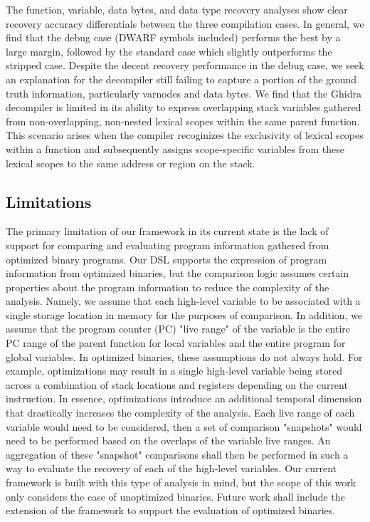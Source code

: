 \documentclass[conference]{IEEEtran}
\begin{document}
The function, variable, data bytes, and data type recovery analyses show clear recovery accuracy differentials between the three compilation cases. In general, we find that the debug case (DWARF symbols included) performs the best by a large margin, followed by the standard case which slightly outperforms the stripped case. Despite the decent recovery performance in the debug case, we seek an explanation for the decompiler still failing to capture a portion of the ground truth information, particularly varnodes and data bytes. We find that the Ghidra decompiler is limited in its ability to express overlapping stack variables gathered from non-overlapping, non-nested lexical scopes within the same parent function. This scenario arises when the compiler recoginizes the exclusivity of lexical scopes within a function and subsequently assigns scope-specific variables from these lexical scopes to the same address or region on the stack.

\subsection{Limitations}

The primary limitation of our framework in its current state is the lack of support for comparing and evaluating program information gathered from optimized binary programs. Our DSL supports the expression of program information from optimized binaries, but the comparison logic assumes certain properties about the program information to reduce the complexity of the analysis. Namely, we assume that each high-level variable to be associated with a single storage location in memory for the purposes of comparison. In addition, we assume that the program counter (PC) "live range" of the variable is the entire PC range of the parent function for local variables and the entire program for global variables. In optimized binaries, these assumptions do not always hold. For example, optimizations may result in a single high-level variable being stored across a combination of stack locations and registers depending on the current instruction. In essence, optimizations introduce an additional temporal dimension that drastically increases the complexity of the analysis. Each live range of each variable would need to be considered, then a set of comparison "snapshots" would need to be performed based on the overlaps of the variable live ranges. An aggregation of these "snapshot" comparisons shall then be performed in such a way to evaluate the recovery of each of the high-level variables. Our current framework is built with this type of analysis in mind, but the scope of this work only considers the case of unoptimized binaries. Future work shall include the extension of the framework to support the evaluation of optimized binaries.
\end{document}
